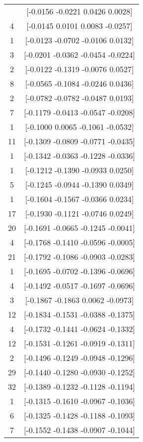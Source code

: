 \documentclass[12pt, fullpage,letterpaper]{article}
\begin{document}
\begin{enumerate}
\begin{enumerate}
{\begin{longtable}{|c|c|}
		\bottomrule
		\endlastfoot
			  4 &    [-0.0156 -0.0221 0.0426 0.0028] \\
			  4 &    [-0.0145 0.0101 0.0083 -0.0257] \\
			  1 &   [-0.0123 -0.0702 -0.0106 0.0132] \\
			  3 &  [-0.0201 -0.0362 -0.0454 -0.0224] \\
			  2 &   [-0.0122 -0.1319 -0.0076 0.0527] \\
			  8 &   [-0.0565 -0.1084 -0.0246 0.0436] \\
			  2 &   [-0.0782 -0.0782 -0.0487 0.0193] \\
			  7 &  [-0.1179 -0.0413 -0.0547 -0.0208] \\
			  1 &   [-0.1000 0.0065 -0.1061 -0.0532] \\
			 11 &  [-0.1309 -0.0809 -0.0771 -0.0435] \\
			  1 &  [-0.1342 -0.0363 -0.1228 -0.0336] \\
			  1 &   [-0.1212 -0.1390 -0.0933 0.0250] \\
			  5 &   [-0.1245 -0.0944 -0.1390 0.0349] \\
			  1 &   [-0.1604 -0.1567 -0.0366 0.0234] \\
			 17 &   [-0.1930 -0.1121 -0.0746 0.0249] \\
			 20 &  [-0.1691 -0.0665 -0.1245 -0.0041] \\
			  4 &  [-0.1768 -0.1410 -0.0596 -0.0005] \\
			 21 &  [-0.1792 -0.1086 -0.0903 -0.0283] \\
			  1 &  [-0.1695 -0.0702 -0.1396 -0.0696] \\
			  4 &  [-0.1492 -0.0517 -0.1697 -0.0696] \\
			  3 &   [-0.1867 -0.1863 0.0062 -0.0973] \\
			 12 &  [-0.1834 -0.1531 -0.0388 -0.1375] \\
			  4 &  [-0.1732 -0.1441 -0.0624 -0.1332] \\
			 12 &  [-0.1531 -0.1261 -0.0919 -0.1311] \\
			  2 &  [-0.1496 -0.1249 -0.0948 -0.1296] \\
			 29 &  [-0.1440 -0.1280 -0.0930 -0.1252] \\
			 32 &  [-0.1389 -0.1232 -0.1128 -0.1194] \\
			  1 &  [-0.1315 -0.1610 -0.0967 -0.1036] \\
			  6 &  [-0.1325 -0.1428 -0.1188 -0.1093] \\
			  7 &  [-0.1552 -0.1438 -0.0907 -0.1044] \\

\end{longtable}}
\end{enumerate}
\end{enumerate}
\end{document}
